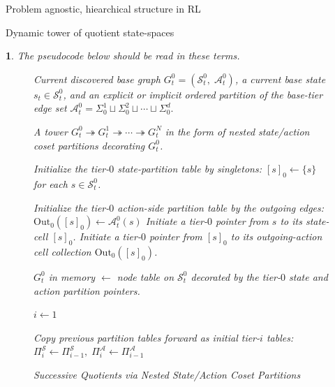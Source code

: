\documentclass[11pt]{article}
\newtheorem{ermark}[subsubsection]{}
\begin{document}
\begin{section}{Problem agnostic, hiearchical structure in RL}
\begin{subsection}{Dynamic tower of quotient state-spaces}
\begin{ermark}
The pseudocode below should be read in these terms.

\begin{figure}[!h]
\begin{algorithm}[H]
\caption{Successive Quotients via Nested State/Action Coset Partitions}
\label{alg: successive_quotients_nested_cosets}
\begin{algorithmic}[1]

\Require
Current discovered base graph $G_t^0=(\mathcal{S}_t^0,\;\mathcal{A}_t^0)$,
a current base state $s_t\in \mathcal{S}_t^0$, and an explicit or implicit ordered partition of the base-tier edge set
$
\mathcal{A}_t^0
=
\Sigma_0^1 \sqcup \Sigma_0^2 \sqcup \cdots \sqcup \Sigma_0^d.
$

\Ensure
A tower $G_t^0 \twoheadrightarrow G_t^1 \twoheadrightarrow \cdots \twoheadrightarrow G_t^N$ in the form of nested state/action coset partitions decorating $G_t^0$.

\Statex




    \State Initialize the tier-$0$ state-partition table by singletons:
    $
    [s]_0 \gets \{s\}
    $
    for each $s\in\mathcal{S}_t^0$.

    \State Initialize the tier-$0$ action-side partition table by the outgoing edges:
    $
    \mathrm{Out}_0([s]_0)\gets \mathcal{A}_t^0(s)
    $
        \State Initiate a tier-$0$ pointer from $s$ to its state-cell $[s]_0$.
        \State Initiate a tier-$0$ pointer from $[s]_0$ to its outgoing-action cell collection $\mathrm{Out}_0([s]_0)$.
    \EndFor

    \State $G_t^0$ in memory $\gets$ node table on $\mathcal{S}_t^0$ decorated by the tier-$0$ state and action partition pointers.

    \State $i \gets 1$

        \State Copy previous partition tables forward as initial tier-$i$ tables:
        $
        \Pi_i^{\mathcal S}\gets \Pi_{i-1}^{\mathcal S},
        \;
        \Pi_i^{\mathcal A}\gets \Pi_{i-1}^{\mathcal A}
        $


\end{algorithmic}
\end{algorithm}
\end{figure}
\end{ermark}
\end{subsection}
\end{section}
\end{document}
